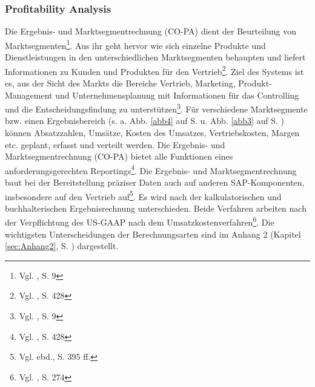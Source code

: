 \subsubsection{Profitability Analysis} %
Die Ergebnis- und Marktsegmentrechnung (CO-PA) dient der Beurteilung von Marktsegmenten\footnote{Vgl. \cite{SAPCOPA2001}, S. 9}.
Aus ihr geht hervor wie sich einzelne Produkte und Dienstleistungen in den unterschiedlichen Marktsegmenten behaupten und liefert Informationen zu Kunden und Produkten für den Vertrieb\footnote{Vgl. \cite{Patel2009}, S. 428}.
Ziel des Systems ist es, aus der Sicht des Markts die Bereiche Vertrieb, Marketing, Produkt-Management und Unternehmensplanung mit Informationen für das Controlling und die Entscheidungsfindung zu unterstützen\footnote{Vgl. \cite{SAPCOPA2001}, S. 9}.
Für verschiedene Marktsegmente bzw. einen Ergebnisbereich (s. a. Abb. \ref{abb4} auf S. \pageref{abb4} u. Abb. \ref{abb3} auf S. \pageref{abb3}) können Absatzzahlen, Umsätze, Kosten des Umsatzes, Vertriebskosten, Margen etc. geplant, erfasst und verteilt werden. Die Ergebnis- und Marktsegmentrechnung (CO-PA) bietet alle Funktionen eines anforderungsgerechten Reportings\footnote{Vgl. \cite{Patel2009}, S. 428}.
Die Ergebnis- und Marktsegmentrechnung baut bei der Bereitstellung präziser Daten auch auf anderen SAP-Komponenten, insbesondere auf den Vertrieb auf\footnote{Vgl. ebd., S. 395 ff.}. Es wird nach der kalkulatorischen und buchhalterischen Ergebnisrechnung unterschieden. Beide Verfahren arbeiten nach der Verpflichtung des US-GAAP nach dem Umsatzkostenverfahren\footnote{Vgl. \cite{Klein2010}, S. 274}. Die wichtigsten Unterscheidungen der Berechnungsarten sind im Anhang 2 (Kapitel \ref{sec:Anhang2}, S. \pageref{sec:Anhang2}) dargestellt.
